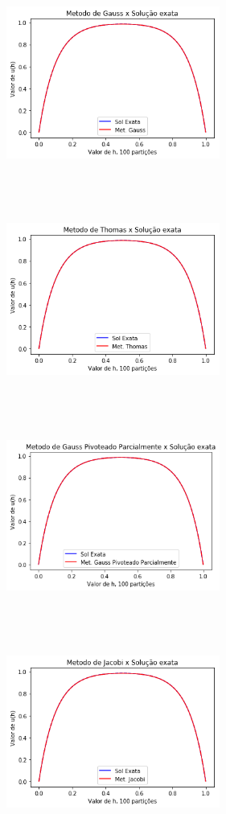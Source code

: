 \documentclass{article}
\begin{document}
\begin{itemize}
\begin{figure}[!htb]
\includegraphics [width=7cm,height=7cm]{G100part.png}
\includegraphics [width=7cm,height=7cm]{T100part}
\includegraphics [width=7cm,height=7cm]{GP100part.png}
\includegraphics [width=7cm,height=7cm]{J100part.png}
\end{figure}


\end{itemize}
\end{document}
